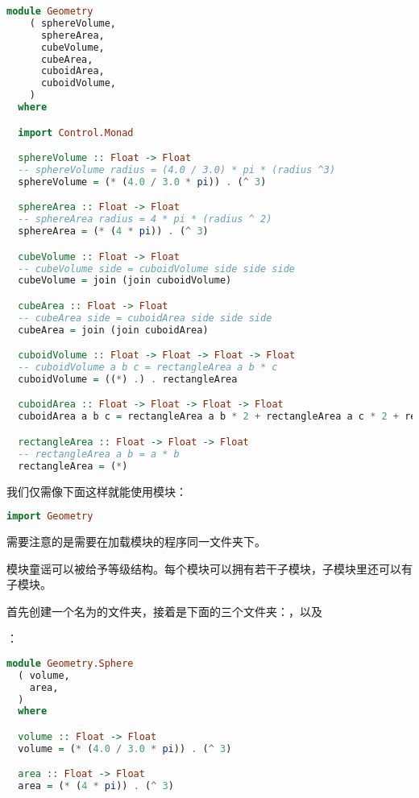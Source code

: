 \documentclass[./main.tex]{subfiles}
\begin{document}
\begin{lstlisting}[language=Haskell]
  module Geometry
    ( sphereVolume,
      sphereArea,
      cubeVolume,
      cubeArea,
      cuboidArea,
      cuboidVolume,
    )
  where

  import Control.Monad

  sphereVolume :: Float -> Float
  -- sphereVolume radius = (4.0 / 3.0) * pi * (radius ^3)
  sphereVolume = (* (4.0 / 3.0 * pi)) . (^ 3)

  sphereArea :: Float -> Float
  -- sphereArea radius = 4 * pi * (radius ^ 2)
  sphereArea = (* (4 * pi)) . (^ 3)

  cubeVolume :: Float -> Float
  -- cubeVolume side = cuboidVolume side side side
  cubeVolume = join (join cuboidVolume)

  cubeArea :: Float -> Float
  -- cubeArea side = cuboidArea side side side
  cubeArea = join (join cuboidArea)

  cuboidVolume :: Float -> Float -> Float -> Float
  -- cuboidVolume a b c = rectangleArea a b * c
  cuboidVolume = ((*) .) . rectangleArea

  cuboidArea :: Float -> Float -> Float -> Float
  cuboidArea a b c = rectangleArea a b * 2 + rectangleArea a c * 2 + rectangleArea c b * 2

  rectangleArea :: Float -> Float -> Float
  -- rectangleArea a b = a * b
  rectangleArea = (*)
\end{lstlisting}

我们仅需像下面这样就能使用模块：

\begin{lstlisting}[language=Haskell]
import Geometry
\end{lstlisting}

需要注意的是需要在加载模块的程序同一文件夹下。

模块童谣可以被给予等级结构。每个模块可以拥有若干子模块，子模块里还可以有子模块。

首先创建一个名为的文件夹，接着是下面的三个文件夹：，以及

：

\begin{lstlisting}[language=Haskell]
  module Geometry.Sphere
  ( volume,
    area,
  )
  where

  volume :: Float -> Float
  volume = (* (4.0 / 3.0 * pi)) . (^ 3)

  area :: Float -> Float
  area = (* (4 * pi)) . (^ 3)
\end{lstlisting}
\end{document}
